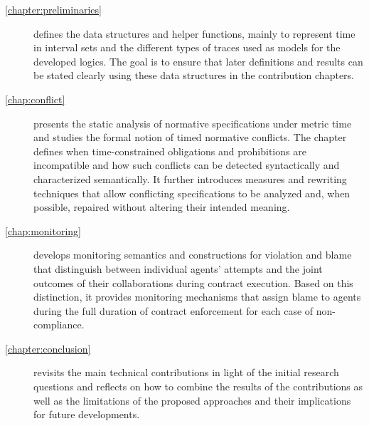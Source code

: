 \begin{description}
  \item[\ref{chapter:preliminaries}] defines the data structures and helper functions, mainly to represent time in interval sets and the different types of traces used as models for the developed logics. The goal is to ensure that later definitions and results can be stated clearly using these data structures in the contribution chapters. 
  \item[\ref{chap:conflict}] presents the static analysis of normative specifications under metric time and studies the formal notion of timed normative conflicts. The chapter defines when time-constrained obligations and prohibitions are incompatible and how such conflicts can be detected syntactically and characterized semantically. It further introduces measures and rewriting techniques that allow conflicting specifications to be analyzed and, when possible, repaired without altering their intended meaning.
  \item[\ref{chap:monitoring}] develops monitoring semantics and constructions for violation and blame that distinguish between individual agents' attempts and the joint outcomes of their collaborations during contract execution. Based on this distinction, it provides monitoring mechanisms that assign blame to agents during the full duration of contract enforcement for each case of non-compliance.
  \item[\ref{chapter:conclusion}] revisits the main technical contributions in light of the initial research questions and reflects on how to combine the results of the contributions as well as the limitations of the proposed approaches and their implications for future developments.
\end{description}

